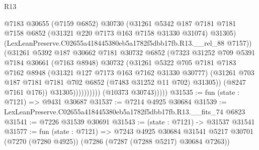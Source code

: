 \begin{lexlean}{R13}
\begin{coremodule}
                                @7183
                                @30655
                                (@7159 @6852)
                                @30730
                                (@31261
                                  @5342
                                  @187
                                  @7181
                                  @7181
                                  @7158
                                  @6852
                                  (@31321 @220 @7173 @163 @7158 @31330 @31074)
                                  @31305)
                                (LexLeanPreserve.C02655a418445380eb5a1782f5dbb17fb.R13.__rel_88
                                  @7157))
                              (@31261
                                @5392
                                @187
                                @30662
                                @7181
                                @30732
                                @6852
                                (@7323
                                  @31252
                                  @709
                                  @5391
                                  @7184
                                  @30661
                                  (@7163 @8948)
                                  @30732
                                  (@31261
                                    @5322
                                    @705
                                    @7181
                                    @7183
                                    @7162
                                    @8948
                                    (@31321 @127 @7173 @163 @7162 @31330 @30777)
                                    (@31261
                                      @703
                                      @187
                                      @7181
                                      @7181
                                      @702
                                      @6852
                                      (@7483 @31252 @11 @702)
                                      @31305))
                                  (@8247 @7161 @176))
                                @31305))))))))))
            (@10373 @30743)))))
@31535 := fun (state : @7121) => @9431 @30687
@31537 := @7214 @4925 @30684
@31539 := LexLeanPreserve.C02655a418445380eb5a1782f5dbb17fb.R13.__fits_74 @6823
@31541 := @7226 @31539 @30691
@31543 := (state : @7121) -> @31537 @31541
@31577 := fun (state : @7121) =>
  @7243
    @4925
    @30684
    @31541
    @5217
    @30701
    (@7270 (@7280 @4925))
    (@7286 (@7287 (@7288 @5217) @30684 @7263))

\end{coremodule}
\end{lexlean}
